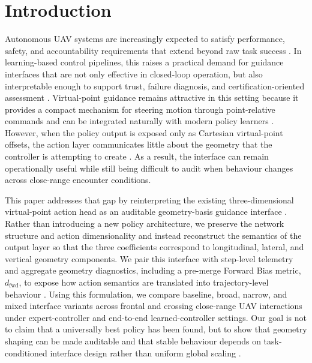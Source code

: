 \documentclass[drones,article,submit,pdftex,moreauthors]{Definitions/mdpi}
\begin{document}
\section{Introduction}

Autonomous UAV systems are increasingly expected to satisfy performance, safety, and accountability requirements that extend beyond raw task success \cite{elmokadem2021,paterson2025,gunning2019}. In learning-based control pipelines, this raises a practical demand for guidance interfaces that are not only effective in closed-loop operation, but also interpretable enough to support trust, failure diagnosis, and certification-oriented assessment \cite{glanois2024,paterson2025,thomas2021}. Virtual-point guidance remains attractive in this setting because it provides a compact mechanism for steering motion through point-relative commands and can be integrated naturally with modern policy learners \cite{zarchan2012}. However, when the policy output is exposed only as Cartesian virtual-point offsets, the action layer communicates little about the geometry that the controller is attempting to create \cite{lai2026aerospace}. As a result, the interface can remain operationally useful while still being difficult to audit when behaviour changes across close-range encounter conditions.

This paper addresses that gap by reinterpreting the existing three-dimensional virtual-point action head as an auditable geometry-basis guidance interface \cite{xu2022ast}. Rather than introducing a new policy architecture, we preserve the network structure and action dimensionality and instead reconstruct the semantics of the output layer so that the three coefficients correspond to longitudinal, lateral, and vertical geometry components. We pair this interface with step-level telemetry and aggregate geometry diagnostics, including a pre-merge Forward Bias metric, $d_{\mathrm{fwd}}$, to expose how action semantics are translated into trajectory-level behaviour \cite{lai2026aerospace}. Using this formulation, we compare baseline, broad, narrow, and mixed interface variants across frontal and crossing close-range UAV interactions under expert-controller and end-to-end learned-controller settings. Our goal is not to claim that a universally best policy has been found, but to show that geometry shaping can be made auditable and that stable behaviour depends on task-conditioned interface design rather than uniform global scaling \cite{wang2023aerospace}.
\end{document}
